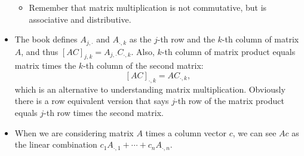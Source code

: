 \documentclass[11pt]{article}
\begin{document}
\begin{itemize}
\begin{itemize}
        \item Remember that matrix multiplication is not commutative, but is associative and distributive.
    \end{itemize}
    \item The book defines $A_{j,\cdot}$ and $A_{\cdot,k}$ as the $j$-th row and the $k$-th column of matrix $A$, and thus $[AC]_{j,k} = A_{j,\cdot}C_{\cdot,k}$. Also, $k$-th column of matrix product equals matrix times the $k$-th column of the second matrix: $$[AC]_{\cdot,k} = AC_{\cdot,k},$$ which is an alternative to understanding matrix multiplication. Obviously there is a row equivalent version that says $j$-th row of the matrix product equals $j$-th row times the second matrix.
    \item When we are considering matrix $A$ times a column vector $c$, we can see $Ac$ as the linear combination $c_1A_{\cdot,1} + \cdots + c_nA_{\cdot,n}$.
\end{itemize}
\end{document}
